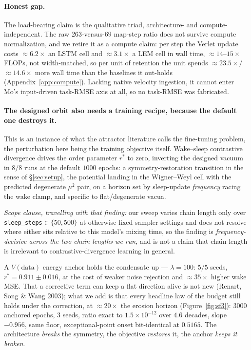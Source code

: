 \documentclass{article}
\begin{document}
\paragraph{Honest gap.} The load-bearing claim is the qualitative triad, architecture- and compute-independent. The raw $263$-versus-$69$ map-step ratio does not survive compute normalization, and we retire it as a compute claim: per step the Verlet update costs $\approx6.2\times$ an LSTM cell and $\approx3.1\times$ a LEM cell in wall time, $\approx14$--$15\times$ FLOPs, not width-matched, so per unit of retention the unit spends $\approx23.5\times$/$\approx14.6\times$ more wall time than the baselines it out-holds (Appendix~\ref{app:compute}). Lacking native velocity ingestion, it cannot enter Mo's input-driven task-RMSE axis at all, so no task-RMSE was fabricated.

\paragraph{The designed orbit also needs a training recipe, because the default one destroys it.} This is an instance of what the attractor literature calls the fine-tuning problem, the perturbation here being the training objective itself. Wake--sleep contrastive divergence drives the order parameter $r^*$ to zero, inverting the designed vacuum in $8/8$ runs at the default $1000$ epochs: a symmetry-restoration transition in the sense of \S\ref{sec:setup}, the potential landing in the Wigner--Weyl cell with the predicted degenerate $\mu^2$ pair, on a horizon set by sleep-update \emph{frequency} racing the wake clamp, and specific to flat/degenerate vacua. {\footnotesize\emph{Scope clause, travelling with that finding:} our sweep varies chain length only over \texttt{sleep\_steps}$\in\{50,500\}$ at otherwise fixed sampler settings and does not resolve where either sits relative to this model's mixing time, so the finding is \emph{frequency-decisive across the two chain lengths we run}, and is not a claim that chain length is irrelevant to contrastive-divergence learning in general.\par} A $V(\text{data})$ energy anchor holds the condensate up --- $\lambda=100$: $5/5$ seeds, $r^*=0.911\pm0.016$, at the cost of weaker noise rejection and $\approx35\times$ higher wake MSE. That a corrective term can keep a flat direction alive is not new (Renart, Song \& Wang 2003); what we add is that every headline law of the budget still holds under the correction, at $\approx20\times$ the erosion horizon (Figure~\ref{fig:sf3}): $3000$ anchored epochs, $3$ seeds, ratio exact to $1.5\!\times\!10^{-12}$ over $4.6$ decades, slope $-0.956$, same floor, exceptional-point onset bit-identical at $0.5165$. The architecture \emph{breaks} the symmetry, the objective \emph{restores} it, the anchor \emph{keeps it broken}.
\end{document}
